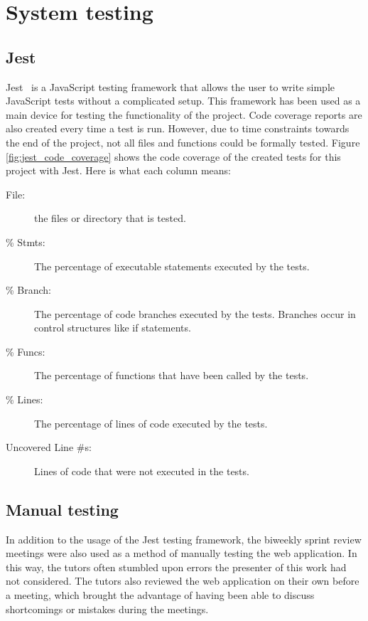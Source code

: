 \section{System testing}
\subsection{Jest}
Jest~\cite{jest} is a JavaScript testing framework that allows the user to write simple JavaScript tests without a complicated setup. This framework has been used as a main device for testing the functionality of the project. Code coverage reports are also created every time a test is run. However, due to time constraints towards the end of the project, not all files and functions could be formally tested. Figure \ref{fig:jest_code_coverage} shows the code coverage of the created tests for this project with Jest.
Here is what each column means:
\begin{description}
    \item[File:] the files or directory that is tested.
    \item[\% Stmts:] The percentage of executable statements executed by the tests.
    \item[\% Branch:] The percentage of code branches executed by the tests. Branches occur in control structures like if statements.
    \item[\% Funcs:] The percentage of functions that have been called by the tests.
    \item[\% Lines:] The percentage of lines of code executed by the tests.
    \item[Uncovered Line \#s:] Lines of code that were not executed in the tests.
\end{description}

\subsection{Manual testing}
In addition to the usage of the Jest testing framework, the biweekly sprint review meetings were also used as a method of manually testing the web application. In this way, the tutors often stumbled upon errors the presenter of this work had not considered. The tutors also reviewed the web application on their own before a meeting, which brought the advantage of having been able to discuss shortcomings or mistakes during the meetings.
